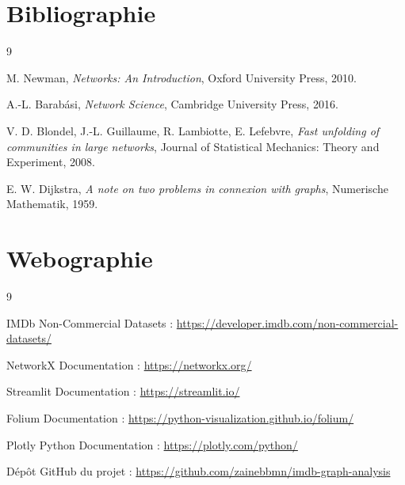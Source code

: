 \documentclass[a4paper,12pt]{article}
\begin{document}
\newpage
\section*{Bibliographie}

\begin{thebibliography}{9}

M. Newman,
\textit{Networks: An Introduction},
Oxford University Press, 2010.

A.-L. Barabási,
\textit{Network Science},
Cambridge University Press, 2016.

V. D. Blondel, J.-L. Guillaume, R. Lambiotte, E. Lefebvre,
\textit{Fast unfolding of communities in large networks},
Journal of Statistical Mechanics: Theory and Experiment, 2008.

E. W. Dijkstra,
\textit{A note on two problems in connexion with graphs},
Numerische Mathematik, 1959.

\end{thebibliography}

\section*{Webographie}

\begin{thebibliography}{9}

IMDb Non-Commercial Datasets :
\url{https://developer.imdb.com/non-commercial-datasets/}

NetworkX Documentation :
\url{https://networkx.org/}

Streamlit Documentation :
\url{https://streamlit.io/}

Folium Documentation :
\url{https://python-visualization.github.io/folium/}

Plotly Python Documentation :
\url{https://plotly.com/python/}

Dépôt GitHub du projet :
\url{https://github.com/zainebbmn/imdb-graph-analysis}

\end{thebibliography}
\end{document}
